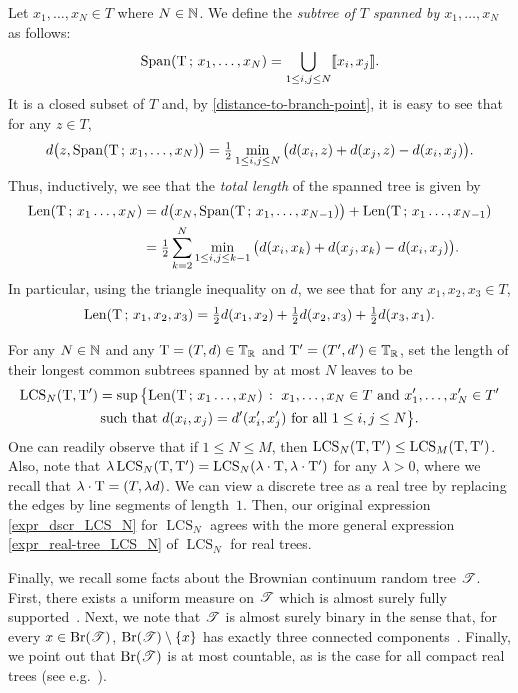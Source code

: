 \documentclass[11pt,reqno]{amsart}
\newcommand{\LCS}{\operatorname{LCS}}
\begin{document}
Let $x_1,\ldots,x_N\in T$ where $N\in \mathbb{N}$. We define the \emph{subtree of $T$ spanned by $x_1,\ldots,x_N$} as follows:
\[\mathrm{Span}(\mathrm{T}\, ;\, x_1,\ldots,x_N)=\bigcup_{1\leq i,j\leq N}\llbracket x_i,x_j\rrbracket.\]
It is a closed subset of $T$ and, by \eqref{distance-to-branch-point}, it is easy to see that for any $z\in T$,
\[d\big(z,\mathrm{Span}(\mathrm{T}\, ;\, x_1,\ldots,x_N)\big)=\tfrac{1}{2}\min_{1\leq i,j\leq N}\big(d(x_i,z)+d(x_j,z)-d(x_i,x_j)\big).\]
Thus, inductively, we see that the \emph{total length} of the spanned tree is given by
\begin{align}
\label{formula_length_span}
\mathrm{Len}(\mathrm{T}\, ;\, x_1\ldots,x_N)&=d\big(x_N,\mathrm{Span}(\mathrm{T}\, ;\, x_1,\ldots,x_{N-1})\big)+\mathrm{Len}(\mathrm{T}\, ;\, x_1\ldots,x_{N-1})\\
\nonumber
&=\tfrac{1}{2}\sum_{k=2}^N \min_{1\leq i,j\leq k-1}\big(d(x_i,x_k)+d(x_j,x_k)-d(x_i,x_j)\big).
\end{align}
In particular, using the triangle inequality on $d$, we see that for any $x_1,x_2,x_3\in T$,
\begin{equation}
\label{formula_length_span3}
\mathrm{Len}(\mathrm{T}\, ;\, x_1,x_2,x_3)=\tfrac{1}{2}d(x_1,x_2)+\tfrac{1}{2}d(x_2,x_3)+\tfrac{1}{2}d(x_3,x_1).
\end{equation}

For any $N\in\mathbb{N}$ and any $\mathrm{T}=(T,d)\in \mathbb{T}_{\mathbb{R}}$ and $\mathrm{T}'=(T',d') \in \mathbb{T}_{\mathbb{R}}$, set the length of their longest common subtrees spanned by at most $N$ leaves to be
\begin{multline}
\label{expr_real-tree_LCS_N}
\LCS_N(\rT,\rT')=\sup\big\{\mathrm{Len}(\rT\, ;\, x_1\ldots,x_N) \, : \, \, x_1,\ldots,x_N\in T\text{ and }x_1',\ldots,x_N'\in T'\\
\text{such that }  d(x_i,x_j)=d'(x_i',x_j')\text{ for all }1\leq i,j\leq N \big\}.
\end{multline}
One can readily observe that if $1\leq N\leq M$, then $\LCS_N(\rT,\rT')\leq \LCS_M(\rT,\rT')$. Also, note that $\lambda \LCS_N(\rT,\rT') = \LCS_N(\lambda\cdot \rT, \lambda\cdot \rT')$ for any $\lambda > 0$, where we recall that $\lambda\cdot \mathrm{T}=(T,\lambda d)$. 
We can view a discrete tree as a real tree by replacing the edges by line segments of length~$1$. Then, our original expression \eqref{expr_dscr_LCS_N} for $\LCS_N$ agrees with the more general expression \eqref{expr_real-tree_LCS_N} of $\LCS_N$ for real trees.
\smallskip 

Finally, we recall some facts about the Brownian continuum random tree $\mathscr{T}$. 
First, there exists a uniform measure on $\mathscr{T}$ which is almost surely fully supported~\cite{aldous1991continuumI}. Next, we note that $\mathscr{T}$ is almost surely binary in the sense that, for every $x \in \mathrm{Br}(\mathscr{T})$, $\mathrm{Br}(\mathscr{T}) \setminus \{x\}$ has exactly three connected components~\cite{aldous1991continuumI}. Finally, we point out that $\mathrm{Br}(\mathscr{T})$ is at most countable, as is the case for all compact real trees (see e.g.~\cite[Lemma 3.1]{duquesne2007growth}).
\smallskip 
\end{document}
